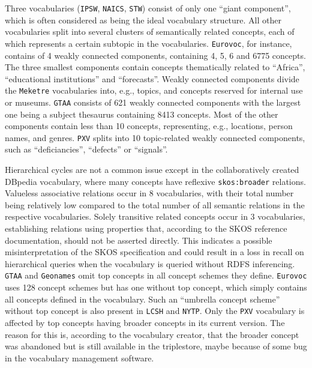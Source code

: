 Three vocabularies (\texttt{IPSW}, \texttt{NAICS}, \texttt{STW}) consist of only one ``giant component'', which is often considered as being the ideal vocabulary structure. All other vocabularies split into several clusters of semantically related concepts, each of which represents a certain subtopic in the vocabularies. \texttt{Eurovoc}, for instance, contains of 4 weakly connected components, containing 4, 5, 6 and 6775 concepts. The three smallest components contain concepts thematically related to ``Africa'', ``educational institutions'' and ``forecasts''. Weakly connected components divide the \texttt{Meketre} vocabularies into, e.g., topics, and concepts reserved for internal use or museums. \texttt{GTAA} consists of 621 weakly connected components with the largest one being a subject thesaurus containing 8413 concepts. Most of the other components contain less than 10 concepts, representing, e.g., locations, person names, and genres. \texttt{PXV} splits into 10 topic-related weakly connected components, such as ``deficiancies'', ``defects'' or ``signals''.

Hierarchical cycles are not a common issue except in the collaboratively created DBpedia vocabulary, where many concepts have reflexive \texttt{skos:broader} relations.
Valueless associative relations occur in 8 vocabularies, with their total number being relatively low compared to the total number of all semantic relations in the respective vocabularies.
Solely transitive related concepts occur in 3 vocabularies, establishing relations using properties that, according to the SKOS reference documentation, should not be asserted directly. This indicates a possible misinterpretation of the SKOS specification and could result in a loss in recall on hierarchical queries when the vocabulary is queried without RDFS inferencing.
\texttt{GTAA} and \texttt{Geonames} omit top concepts in all concept schemes they define. \texttt{Eurovoc} uses 128 concept schemes but has one without top concept, which simply contains all concepts defined in the vocabulary. Such an ``umbrella concept scheme'' without top concept is also present in \texttt{LCSH} and \texttt{NYTP}.
Only the \texttt{PXV} vocabulary is affected by top concepts having broader concepts in its current version. The reason for this is, according to the vocabulary creator, that the broader concept was abandoned but is still available in the triplestore, maybe because of some bug in the vocabulary management software.

